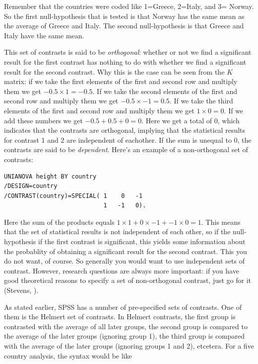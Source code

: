 \documentclass[]{book}\usepackage[]{graphicx}\usepackage[]{color}
\begin{document}
Remember that the countries were coded like 1=Greece, 2=Italy, and 3= Norway. So the first null-hypothesis that is tested is that Norway has the same mean as the average of Greece and Italy. The second null-hypothesis is that Greece and Italy have the same mean.

This set of contrasts is said to be \textit{orthogonal}: whether or not we find a significant result for the first contrast has nothing to do with whether we find a significant result for the second contrast. Why this is the case can be seen from the $K$ matrix: if we take the first elements of the first and second row and multiply them we get $-0.5 \times 1 = -0.5$. If we take the second elements of the first and second row and multiply them we get $-0.5 \times -1 = 0.5$. If we take the third elements of the first and second row and multiply them we get $1 \times 0 = 0$. If we add these numbers we get $-0.5 + 0.5 +0= 0 $. Here we get a total of 0, which indicates that the contrasts are orthogonal, implying that the statistical results for contrast 1 and 2 are independent of eachother. If the sum is unequal to 0, the contrasts are said to be \textit{dependent}. 
Here's an example of a non-orthogonal set of contrasts:

\begin{verbatim}
UNIANOVA height BY country
/DESIGN=country
/CONTRAST(country)=SPECIAL( 1    0   -1
                            1   -1   0).
\end{verbatim}

Here the sum of the products equals $1\times 1 +0\times -1 + -1 \times 0 =1$. This means that the set of statistical results is not independent of each other, so if the null-hypothesis if the first contrast is significant, this yields some information about the probablity of obtaining a significant result for the second contrast. This you do not want, of course. So generally you would want to use independent sets of contrast. However, research questions are always more important: if you have good theoretical reasons to specify a set of non-orthogonal contrast, just go for it (Stevens, ).

As stated earlier, SPSS has a number of pre-specified sets of contrasts. One of them is the Helmert set of contrasts. In Helmert contrasts, the first group is contrasted with the average of all later groups, the second group is compared to the average of the later groups (ignoring group 1), the third group is compared with the average of the later groups (ignoring groups 1 and 2), etcetera. For a five country analysis, the syntax would be like
\end{document}

